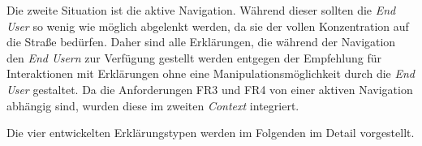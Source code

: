 Die zweite Situation ist die aktive Navigation. Während dieser sollten die \textit{End User} so wenig wie möglich abgelenkt werden, da sie der vollen Konzentration auf die Straße bedürfen. Daher sind alle Erklärungen, die während der Navigation den \textit{End Usern} zur Verfügung gestellt werden entgegen der Empfehlung für Interaktionen mit Erklärungen ohne eine Manipulationsmöglichkeit durch die \textit{End User} gestaltet. Da die Anforderungen FR3 und FR4 von einer aktiven Navigation abhängig sind, wurden diese im zweiten \textit{Context} integriert.

Die vier entwickelten Erklärungstypen werden im Folgenden im Detail vorgestellt.









